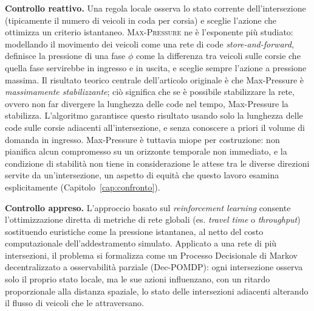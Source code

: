 \textbf{Controllo reattivo.} Una regola locale osserva lo stato corrente
dell'intersezione (tipicamente il numero di veicoli in coda per corsia) e
sceglie l'azione che ottimizza un criterio istantaneo. \textsc{Max-Pressure}
\citep{varaiya2013maxpressure} ne è l'esponente più studiato: modellando il
movimento dei veicoli come una rete di code \emph{store-and-forward}, definisce la pressione di una fase $\phi$ come la
differenza tra veicoli sulle corsie che quella fase servirebbe in ingresso e
in uscita, e sceglie sempre l'azione a pressione massima. Il risultato
teorico centrale dell'articolo originale è che
Max-Pressure è \emph{massimamente stabilizzante}; ciò significa che se è 
possibile stabilizzare la rete, ovvero non far divergere la lunghezza delle code nel tempo, 
Max-Pressure la stabilizza. L'algoritmo garantisce questo risultato usando solo la
lunghezza delle code sulle corsie adiacenti all'intersezione, e senza
conoscere a priori il volume di domanda in ingresso. Max-Pressure è 
tuttavia miope per costruzione: non pianifica alcun compromesso su un
orizzonte temporale non immediato, e la condizione di stabilità non
tiene in considerazione le attese tra le diverse direzioni
servite da un'intersezione, un aspetto di equità che questo lavoro esamina
esplicitamente (Capitolo~\ref{cap:confronto}).

\textbf{Controllo appreso.} L'approccio basato sul \emph{reinforcement learning} consente l'ottimizzazione 
diretta di metriche di rete globali (es. \emph{travel time} o \emph{throughput}) 
sostituendo euristiche come la pressione istantanea, al netto del 
costo computazionale dell'addestramento simulato.
Applicato a una rete di più intersezioni, il problema si formalizza come un Processo Decisionale di Markov decentralizzato a 
osservabilità parziale (Dec-POMDP): ogni intersezione osserva solo il proprio stato
locale, ma le sue azioni influenzano,
con un ritardo proporzionale alla distanza spaziale, lo stato delle intersezioni
adiacenti alterando il flusso di veicoli che le attraversano.

